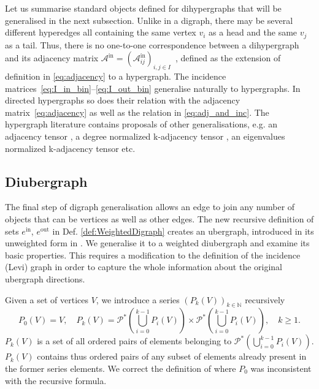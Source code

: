 \documentclass[a4paper,12pt]{article}
\theoremstyle{definition}
\theoremstyle{remark}
\newcommand{\aadd}[2][]{\added[id=Alex,comment=#1]{#2}}
\newcommand{\adel}[2][]{\deleted[id=Alex,comment=#1]{#2}}
\newcommand{\tin}{\mathrm{in}} %
\newcommand{\out}{\mathrm{out}}
\newcommand{\NN}{\mathbb{N}}
\begin{document}
Let us summarise standard objects defined for dihypergraphs that will be generalised in the next subsection. Unlike in a digraph, there may be several different hyperedges all containing the same vertex $v_i$ as a head and the same $v_j$ as a tail. Thus, there is no one-to-one correspondence between a dihypergraph and its adjacency matrix $\mathcal{A}^{\tin}=(\mathcal{A}_{ij}^{\tin})_{i,j\in I}$~\cite{BATTISTON20201}, defined as the extension of definition in \eqref{eq:adjacency} to a hypergraph. 
The incidence matrices~\eqref{eq:I_in_bin}--\eqref{eq:I_out_bin} generalise naturally to hypergraphs. In directed hypergraphs so does their relation with the adjacency matrix~\eqref{eq:adjacency} as well as the relation in \eqref{eq:adj_and_inc}. %
The hypergraph literature contains proposals of other generalisations, e.g. an adjacency tensor \cite{Michoel2012}, a degree normalized k-adjacency tensor \cite{COOPER2012}, an eigenvalues normalized k-adjacency tensor \cite{Hu2013} etc. %

\subsection{Diubergraph}\label{sec:U_graph}

The final step of digraph generalisation allows an edge to join any number of objects that can be vertices as well as other edges. The new recursive definition of sets $e^{\tin}$, $e^{\out}$ in Def. \ref{def:WeightedDigraph} creates an ubergraph, introduced in its unweighted form in \cite{Joslyn2017UbergraphsAD}. We generalise it to a weighted diubergraph and examine its basic properties. This requires a modification to the definition of the incidence (Levi) graph in order to capture the whole information about the original ubergraph directions.

Given a set of vertices $V$, we introduce a series $(P_k(V))_{k\in \NN}$ recursively 
\begin{equation}
       P_0(V) = V, \quad P_{k}(V) =\mathcal{P}^* \left( \bigcup_{i=0}^{k-1} P_i(V)\right) \times \mathcal{P}^* \left(\bigcup_{i=0}^{k-1} P_i(V)\right) , \quad k\geq 1.
\end{equation}
 $P_k(V)$ is a set of all ordered pairs of elements belonging to $\mathcal{P}^* \left( \bigcup_{i=0}^{k-1} P_i(V)\right)$. $P_k(V)$ contains thus ordered pairs of any subset of elements already present in the former series elements. We correct the definition of \cite{Joslyn2017UbergraphsAD} where $P_0$ was inconsistent with the recursive formula.
\end{document}
